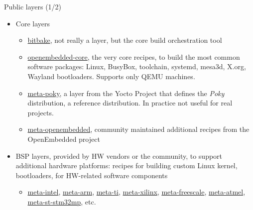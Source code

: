 \begin{frame}{Public layers (1/2)}
  \begin{itemize}
  \item Core layers
    \begin{itemize}
    \item \href{https://git.openembedded.org/bitbake/}{bitbake}, not
      really a layer, but the core build orchestration tool
    \item \href{https://git.openembedded.org/openembedded-core}{openembedded-core},
      the very core recipes, to build the most common software
      packages: Linux, BusyBox, toolchain, systemd, mesa3d, X.org, Wayland
      bootloaders. Supports only QEMU machines.
    \item \href{https://git.yoctoproject.org/meta-yocto/tree/meta-poky}{meta-poky}, a layer
      from the Yocto Project that defines the {\em Poky} distribution, a
      reference distribution. In practice not useful for real projects.
    \item
      \href{http://cgit.openembedded.org/meta-openembedded/}{meta-openembedded},
      community maintained additional recipes from the OpenEmbedded
      project
    \end{itemize}
  \item BSP layers, provided by HW vendors or the community, to
    support additional hardware platforms: recipes for building custom
    Linux kernel, bootloaders, for HW-related software components
    \begin{itemize}
    \item \href{https://git.yoctoproject.org/meta-intel/}{meta-intel},
      \href{https://git.yoctoproject.org/meta-arm/}{meta-arm},
      \href{https://git.yoctoproject.org/meta-ti/}{meta-ti},
      \href{https://git.yoctoproject.org/meta-xilinx/}{meta-xilinx},
      \href{https://git.yoctoproject.org/meta-freescale/}{meta-freescale},
      \href{https://github.com/linux4sam/meta-atmel}{meta-atmel},
      \href{https://github.com/STMicroelectronics/meta-st-stm32mp}{meta-st-stm32mp},
      etc.
    \end{itemize}
  \end{itemize}
\end{frame}

